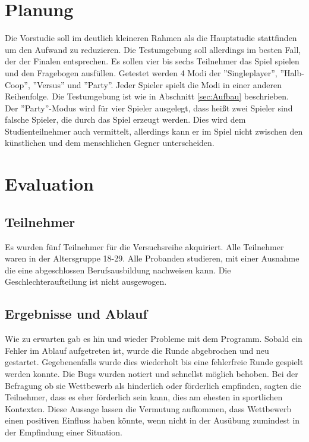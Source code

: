 \section{Planung}
Die Vorstudie soll im deutlich kleineren Rahmen als die Hauptstudie stattfinden um den Aufwand zu reduzieren. Die Testumgebung soll allerdings im besten Fall, der der Finalen  entsprechen. Es sollen vier bis sechs Teilnehmer das Spiel spielen und den Fragebogen ausfüllen. Getestet werden 4 Modi der ''Singleplayer'', ''Halb-Coop'', ''Versus'' und ''Party''. Jeder Spieler spielt die Modi in einer anderen Reihenfolge. Die Testumgebung ist wie in Abschnitt \ref{sec:Aufbau} beschrieben. Der ''Party''-Modus wird für vier Spieler ausgelegt, dass heißt zwei Spieler sind falsche Spieler, die durch das Spiel erzeugt werden. Dies wird dem Studienteilnehmer auch vermittelt, allerdings kann er im Spiel nicht zwischen den künstlichen und dem menschlichen Gegner unterscheiden.
\section{Evaluation}
\subsection{Teilnehmer}
Es wurden fünf Teilnehmer für die Versuchsreihe akquiriert. Alle Teilnehmer waren  in der Altersgruppe 18-29. Alle Probanden studieren, mit einer Ausnahme die eine abgeschlossen Berufsausbildung nachweisen kann. Die Geschlechteraufteilung ist nicht ausgewogen.
\subsection{Ergebnisse und Ablauf}
Wie zu erwarten gab es hin und wieder Probleme mit dem Programm. Sobald ein Fehler im Ablauf aufgetreten ist, wurde die Runde abgebrochen und neu gestartet. Gegebenenfalls wurde dies wiederholt bis eine fehlerfreie Runde gespielt werden konnte. Die Bugs wurden notiert und schnellst möglich behoben.\newline
Bei der Befragung ob sie Wettbewerb als hinderlich oder förderlich empfinden, sagten die Teilnehmer, dass es eher förderlich sein kann, dies am ehesten in sportlichen Kontexten. Diese Aussage lassen die Vermutung aufkommen, dass Wettbewerb einen positiven Einfluss haben könnte, wenn nicht in der Ausübung zumindest in der Empfindung einer Situation.%

